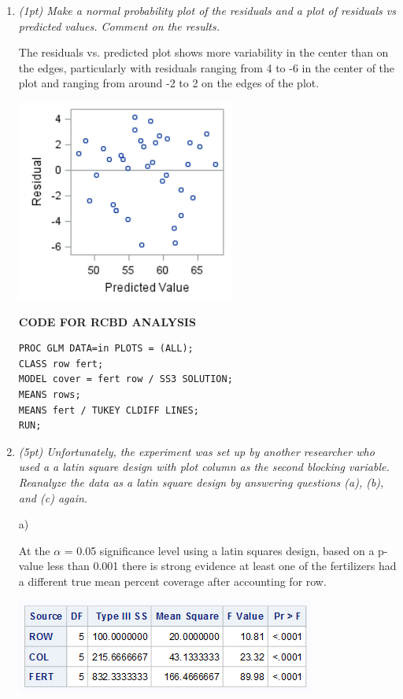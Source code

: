 \documentclass{article}\usepackage[]{graphicx}\usepackage[]{color}
\begin{document}
\begin{enumerate}
\begin{enumerate}
\item 
{\it (1pt) Make a normal probability plot of the residuals and a plot of residuals vs predicted values. Comment on the results.}

The residuals vs. predicted plot shows more variability in the center than on the edges, particularly with residuals ranging from 4 to -6 in the center of the plot and ranging from around -2 to 2 on the edges of the plot.

\begin{center}
\includegraphics{prob1c}
\end{center}

{\bf CODE FOR RCBD ANALYSIS}

\begin{verbatim}
PROC GLM DATA=in PLOTS = (ALL);
CLASS row fert;
MODEL cover = fert row / SS3 SOLUTION;
MEANS rows;
MEANS fert / TUKEY CLDIFF LINES;
RUN;
\end{verbatim}

\item
{\it (5pt) Unfortunately, the experiment was set up by another researcher who used a a latin square design with plot column as the second blocking variable. Reanalyze the data as a latin square design by answering questions (a), (b), and (c) again.}

a)

At the $\alpha$ = 0.05 significance level using a latin squares design, based on a p-value less than 0.001 there is strong evidence at least one of the fertilizers had a different true mean percent coverage after accounting for row.

\begin{center}
\includegraphics{latin1a}
\end{center}


\end{enumerate}
\end{enumerate}
\end{document}
